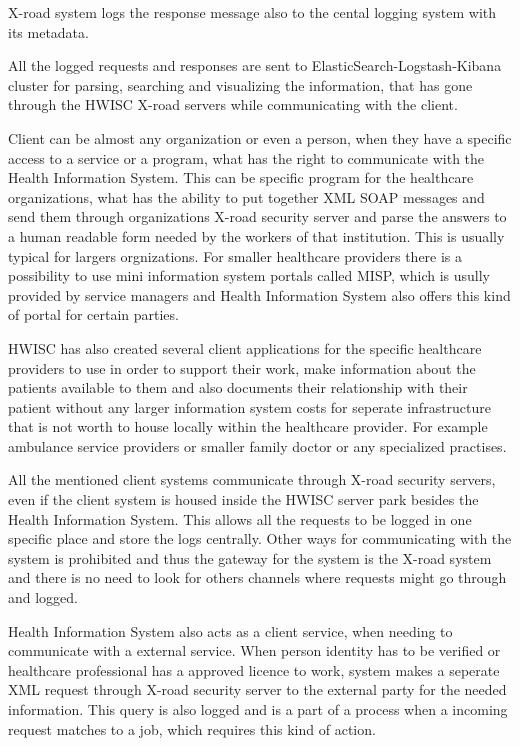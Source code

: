 \documentclass[a4paper, 12pt]{article}
\begin{document}
X-road system logs the response message also to the cental logging system with its metadata. 

All the logged requests and responses are sent to ElasticSearch-Logstash-Kibana cluster for parsing, searching and visualizing the information, that has gone through the HWISC X-road servers while communicating with the client. 

Client can be almost any organization or even a person, when they have a specific access to a service or a program, what has the right to communicate with the Health Information System. This can be specific program for the healthcare organizations, what has the ability to put together XML SOAP messages and send them through organizations X-road security server and parse the answers to a human readable form needed by the workers of that institution. 
This is usually typical for largers orgnizations. For smaller healthcare providers there is a possibility to use mini information system portals called MISP, which is usully provided by service managers and Health Information System also offers this kind of portal for certain parties. 

HWISC has also created several client applications for the specific healthcare providers to use in order to support their work, make information about the patients available to them and also documents their relationship with their patient without any larger information system costs for seperate infrastructure that is not worth to house locally within the healthcare provider. For example ambulance service providers or smaller family doctor or any specialized practises. 

All the mentioned client systems communicate through X-road security servers, even if the client system is housed inside the HWISC server park besides the Health Information System. This allows all the requests to be logged in one specific place and store the logs centrally. Other ways for communicating with the system is prohibited and thus the gateway for the system is the X-road system and there is no need to look for others channels where requests might go through and logged. 

Health Information System also acts as a client service, when needing to communicate with a external service. When person identity has to be verified or healthcare professional has a approved licence to work, system makes a seperate XML request through X-road security server to the external party for the needed information. This query is also logged and is a part of a process when a incoming request matches to a job, which requires this kind of action. 
\end{document}
